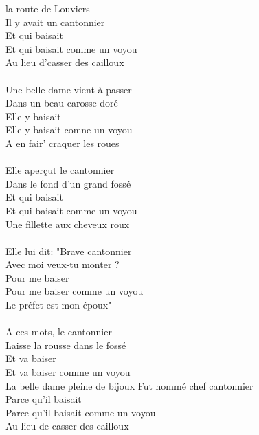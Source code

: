 
 la route de Louviers \bissimple 
\\Il y avait un cantonnier\bissimple 
\\Et qui baisait \bissimple 
\\Et qui baisait comme un voyou  
\\Au lieu d'casser des cailloux  
\\\\Une belle dame vient à passer \bissimple 
\\Dans un beau carosse doré \bissimple 
\\Elle y baisait \bissimple 
\\Elle y baisait comne un voyou  
\\A en fair' craquer les roues  
\\\\Elle aperçut le cantonnier \bissimple 
\\Dans le fond d'un grand fossé \bissimple 
\\Et qui baisait \bissimple 
\\Et qui baisait comme un voyou  
\\Une fillette aux cheveux roux  
\\\\Elle lui dit: "Brave cantonnier \bissimple 
\\Avec moi veux-tu monter ? \bissimple 
\\Pour me baiser \bissimple 
\\Pour me baiser comme un voyou
\\Le préfet est mon époux"  
\\\\A ces mots, le cantonnier \bissimple 
\\Laisse la rousse dans le fossé \bissimple 
\\Et va baiser \bissimple 
\\Et va baiser comme un voyou  
\\La belle dame pleine de bijoux  
{Fut nommé chef cantonnier}
\\Parce qu'il baisait \bissimple 
\\Parce qu'il baisait comme un voyou  
\\Au lieu de casser des cailloux  
